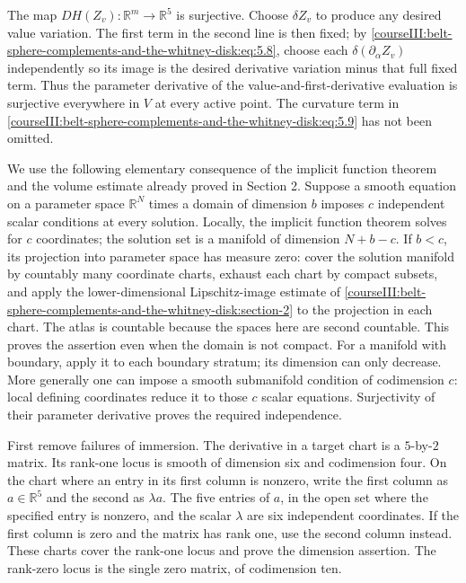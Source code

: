 The map \(DH(Z_v):\mathbb R^m\to\mathbb R^5\) is surjective. Choose \(\delta Z_v\) to produce any desired value variation. The first term in the second line is then fixed; by \eqref{courseIII:belt-sphere-complements-and-the-whitney-disk:eq:5.8}, choose each \(\delta(\partial_\alpha Z_v)\) independently so its image is the desired derivative variation minus that full fixed term. Thus the parameter derivative of the value-and-first-derivative evaluation is surjective everywhere in \(V\) at every active point. The curvature term in \eqref{courseIII:belt-sphere-complements-and-the-whitney-disk:eq:5.9} has not been omitted.

We use the following elementary consequence of the implicit function theorem and the volume estimate already proved in Section 2. Suppose a smooth equation on a parameter space \(\mathbb R^N\) times a domain of dimension \(b\) imposes \(c\) independent scalar conditions at every solution. Locally, the implicit function theorem solves for \(c\) coordinates; the solution set is a manifold of dimension \(N+b-c\). If \(b<c\), its projection into parameter space has measure zero: cover the solution manifold by countably many coordinate charts, exhaust each chart by compact subsets, and apply the lower-dimensional Lipschitz-image estimate of \cref{courseIII:belt-sphere-complements-and-the-whitney-disk:section-2} to the projection in each chart. The atlas is countable because the spaces here are second countable. This proves the assertion even when the domain is not compact. For a manifold with boundary, apply it to each boundary stratum; its dimension can only decrease. More generally one can impose a smooth submanifold condition of codimension \(c\): local defining coordinates reduce it to those \(c\) scalar equations. Surjectivity of their parameter derivative proves the required independence.

First remove failures of immersion. The derivative in a target chart is a \(5\)-by-\(2\) matrix. Its rank-one locus is smooth of dimension six and codimension four. On the chart where an entry in its first column is nonzero, write the first column as \(a\in\mathbb R^5\) and the second as \(\lambda a\). The five entries of \(a\), in the open set where the specified entry is nonzero, and the scalar \(\lambda\) are six independent coordinates. If the first column is zero and the matrix has rank one, use the second column instead. These charts cover the rank-one locus and prove the dimension assertion. The rank-zero locus is the single zero matrix, of codimension ten.

